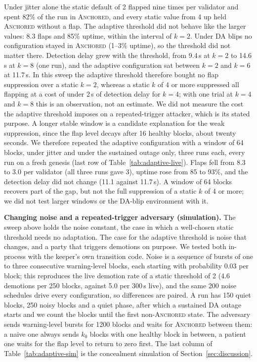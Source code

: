 Under jitter alone the static default of 2 flapped nine times per validator and
spent 82\% of the run in \textsc{Anchored}, and every static value from 4 up
held \textsc{Anchored} without a flap. The adaptive threshold did not behave
like the larger values: 8.3 flaps and 85\% uptime, within the interval of
$k{=}2$. Under DA blips no configuration stayed in \textsc{Anchored} (1--3\%
uptime), so the threshold did not matter there. Detection delay grew with the
threshold, from 9.4\,s at $k{=}2$ to 14.6\,s at $k{=}8$ (one run), and the
adaptive configuration sat between $k{=}2$ and $k{=}6$ at 11.7\,s. In this
sweep the adaptive threshold therefore bought no flap suppression over a static
$k{=}2$, whereas a static $k$ of 4 or more suppressed all flapping at a cost of
under 2\,s of detection delay for $k{=}4$; with one trial at $k{=}4$ and
$k{=}8$ this is an observation, not an estimate. We did not measure the
cost the adaptive threshold imposes on a repeated-trigger attacker, which is
its stated purpose. A longer stable window is a candidate explanation for the
weak suppression, since the flap level decays after 16 healthy blocks, about
twenty seconds. We therefore repeated the adaptive configuration with a window
of 64 blocks, under jitter and under the sustained outage only, three runs each,
every run on a fresh genesis (last row of Table~\ref{tab:adaptive-live}). Flaps
fell from 8.3 to 3.0 per validator (all three runs gave 3), uptime rose from 85
to 93\%, and the detection delay did not change (11.1 against 11.7\,s). A
window of 64 blocks recovers part of the gap, but not the full suppression of a
static $k$ of 4 or more; we did not test larger windows or the DA-blip
environment with it.

\textbf{Changing noise and a repeated-trigger adversary (simulation).} The sweep
above holds the noise constant, the case in which a well-chosen static
threshold needs no adaptation. The case for the adaptive threshold is noise
that changes, and a party that triggers demotions on purpose. We tested both
in-process with the keeper's own transition code. Noise is a sequence of
bursts of one to three consecutive warning-level blocks, each starting with
probability 0.03 per block; this reproduces the live demotion rate of a static
threshold of 2 (4.6 demotions per 250 blocks, against 5.0 per 300\,s live),
and the same 200 noise schedules drive every configuration, so differences are
paired. A run has 150 quiet blocks, 250 noisy blocks and a quiet phase, after
which a sustained DA outage starts and we count the blocks until the first
non-\textsc{Anchored} state. The adversary sends warning-level bursts for 1200
blocks and waits for \textsc{Anchored} between them: a naive one always sends
$k_0$ blocks with one healthy block in between, a patient one waits for the flap
level to return to zero first. The last column of Table~\ref{tab:adaptive-sim} is the concealment
simulation of Section~\ref{sec:discussion}.

